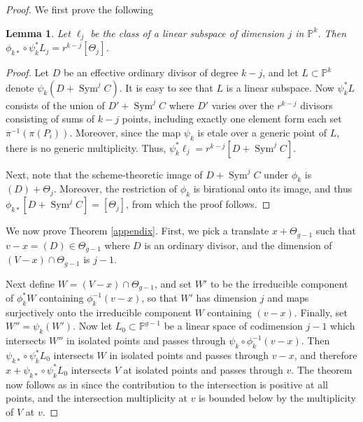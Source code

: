 \documentclass[12pt]{amsart}
\newtheorem{lemma}[theorem]{Lemma}
\theoremstyle{definition}
\theoremstyle{remark}
\def \Sym {\operatorname{Sym}}
\def \PP {\mathbb P}
\begin{document}
\begin{proof}

We first prove the following

\begin{lemma}

Let $\ell_j$ be the class of a linear subspace of dimension $j$ in $\PP^k$. Then $\phi_{k*}\circ\psi_k^*L_j = r^{k-j} [\Theta_j]$. 

\end{lemma}

\begin{proof}

Let $D$ be an effective ordinary divisor of degree $k-j$, and let $L\subset\PP^k$ denote
$\psi_k(D+\Sym^j C)$. It is easy to see that $L$ is a linear subspace. Now $\psi_k^*L$ consists of the union of $D'+\Sym^jC$ where $D'$ varies over the $r^{k-j}$ divisors
consisting of  sums of $k-j$ points, including exactly one element form each set $\pi^{-1}(\pi(P_i))$. Moreover, since the map $\psi_k$ is etale over a generic point
of $L$, there is no generic multiplicity. Thus, $\psi_k^*\ell_j = r^{k-j} [D+\Sym^j C]$. 

Next, note that the scheme-theoretic image of $D+\Sym^jC$ under $\phi_k$ is  $(D) + \Theta_j$. Moreover, the restriction of $\phi_k$  is birational onto its image, and thus
$\phi_{k*}[D+\Sym^jC] = [\Theta_j]$, from which the proof follows.

\end{proof}

We now prove Theorem \ref{appendix}. First, we pick a translate $x+\Theta_{g-1}$ such that $v-x=(D)\in\Theta_{g-1}$ where $D$ is an ordinary divisor, and the dimension of $(V-x)\cap \Theta_{g-1}$ is $j-1$.

Next define $W=(V-x)\cap\Theta_{g-1}$, and set $W'$ to be the irreducible component of $\phi_k^* W$ containing $\phi_k^{-1}(v-x)$, so that $W'$ has dimension $j$ and maps surjectively onto the irreducible component $W$ containing $(v-x)$. Finally, set $W'' = \psi_k(W')$. Now let $L_0\subset \PP^{g-1}$ be a linear space of codimension $j-1$ which intersects $W''$ in isolated points and passes through 
$\psi_k\circ\phi_k^{-1}(v-x)$. 
Then $\psi_{k*}\circ\psi_k^*L_0$ intersects $W$ in isolated points and passes through $v-x$, and therefore $x+\psi_{k*}\circ\psi_k^*L_0$ intersects $V$ at isolated points and passes
through $v$. The theorem now follows as in \citep[Proposition 3.25]{TS} since the contribution to the intersection is positive at all points, and the intersection multiplicity at $v$ is bounded below by the multiplicity of $V$ at $v$.



\end{proof}




 


\end{document}
